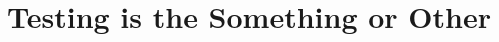 \documentclass[sigconf,natbib=false]{acmart}
\begin{document}
\title{Testing is the Something or Other}









\end{document}
